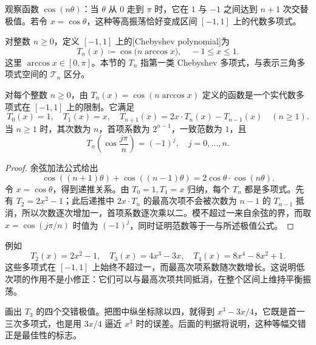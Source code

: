 观察函数 \(\cos(n\theta)\)：当 \(\theta\) 从 \(0\) 走到 \(\pi\) 时，它在 \(1\) 与 \(-1\) 之间达到 \(n+1\) 次交替极值。若令 \(x=\cos\theta\)，这种等高振荡恰好变成区间 \([-1,1]\) 上的代数多项式。

\begin{definition}
\label{b2:def:approximation-chebyshev-polynomial}
对整数 \(n\geq0\)，定义 \([-1,1]\) 上的[Chebyshev polynomial]为
\[
 T_n(x)\coloneqq\cos\bigl(n\arccos x\bigr),\quad -1\leq x\leq1.
\]
这里 \(\arccos x\in[0,\pi]\)。本节的 \(T_n\) 指第一类 Chebyshev 多项式，与表示三角多项式空间的 \(\mathcal T_n\) 区分。
\end{definition}

\begin{proposition}
\label{b2:prop:approximation-chebyshev-properties}
对每个整数 \(n\geq0\)，由 \(T_n(x)=\cos(n\arccos x)\) 定义的函数是一个实代数多项式在 \([-1,1]\) 上的限制。它满足
\[
 T_0(x)=1,\quad T_1(x)=x,\quad
 T_{n+1}(x)=2x\cdot T_n(x)-T_{n-1}(x)\quad(n\geq1).
\]
当 \(n\geq1\) 时，其次数为 \(n\)，首项系数为 \(2^{n-1}\)，一致范数为 \(1\)，且
\[
 T_n\!\left(\cos\frac{j\pi}{n}\right)=(-1)^j,
 \quad j=0,\ldots,n.
\]
\end{proposition}
\begin{proof}
余弦加法公式给出
\[
 \cos((n+1)\theta)+\cos((n-1)\theta)
 =2\cos\theta\cdot\cos(n\theta).
\]
令 \(x=\cos\theta\)，得到递推关系。由 \(T_0=1,T_1=x\) 归纳，每个 \(T_n\) 都是多项式。先有 \(T_2=2x^2-1\)；此后递推中 \(2x\cdot T_n\) 的最高次项不会被次数为 \(n-1\) 的 \(T_{n-1}\) 抵消，所以次数逐次增加一，首项系数逐次乘以二。模不超过一来自余弦的界，而取 \(x=\cos(j\pi/n)\) 时值为 \((-1)^j\)，同时证明范数等于一与所述极值公式。
\end{proof}

例如
\[
 T_2(x)=2x^2-1,\quad T_3(x)=4x^3-3x,\quad
 T_4(x)=8x^4-8x^2+1.
\]
这些多项式在 \([-1,1]\) 上始终不超过一，而最高次项系数随次数增长。这说明低次项的作用不是小修正：它们可以与最高次项共同抵消，在整个区间上维持平衡振荡。

\ProseParagraphBreak
{}画出 \(T_3\) 的四个交错极值。把图中纵坐标除以四，就得到 \(x^3-3x/4\)，它既是首一三次多项式，也是用 \(3x/4\) 逼近 \(x^3\) 时的误差。后面的判据将说明，这种等幅交错正是最佳性的标志。


